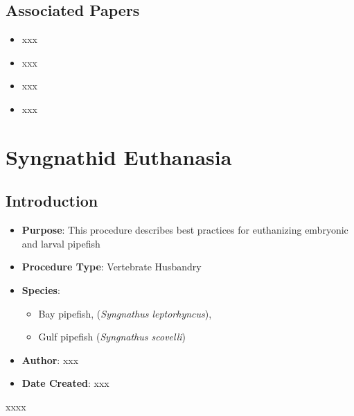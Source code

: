 \documentclass[
  letterpaper,
  DIV=11,
  numbers=noendperiod]{scrreprt}
\providecommand{\tightlist}{%
  \setlength{\itemsep}{0pt}\setlength{\parskip}{0pt}}\usepackage{longtable,booktabs,array}
\begin{document}
\hypertarget{associated-papers-37}{%
\section{Associated Papers}\label{associated-papers-37}}

\begin{itemize}
\tightlist
\item
  xxx
\item
  xxx
\item
  xxx
\item
  xxx
\end{itemize}

\hypertarget{sec-husbandry-euthanasia_syngnathid}{%
\chapter{Syngnathid
Euthanasia}\label{sec-husbandry-euthanasia_syngnathid}}

\hypertarget{introduction-59}{%
\section{Introduction}\label{introduction-59}}

\begin{itemize}
\tightlist
\item
  \textbf{Purpose}: This procedure describes best practices for
  euthanizing embryonic and larval pipefish
\item
  \textbf{Procedure Type}: Vertebrate Husbandry
\item
  \textbf{Species}:

  \begin{itemize}
  \tightlist
  \item
    Bay pipefish, (\emph{Syngnathus leptorhyncus}),
  \item
    Gulf pipefish (\emph{Syngnathus scovelli})
  \end{itemize}
\item
  \textbf{Author}: xxx
\item
  \textbf{Date Created}: xxx
\end{itemize}

\begin{tcolorbox}[enhanced jigsaw, rightrule=.15mm, title=\textcolor{quarto-callout-warning-color}{\faExclamationTriangle}\hspace{0.5em}{NOTES}, titlerule=0mm, opacitybacktitle=0.6, toprule=.15mm, bottomrule=.15mm, opacityback=0, left=2mm, colframe=quarto-callout-warning-color-frame, breakable, coltitle=black, colback=white, colbacktitle=quarto-callout-warning-color!10!white, bottomtitle=1mm, leftrule=.75mm, toptitle=1mm, arc=.35mm]

xxxx

\end{tcolorbox}
\end{document}
